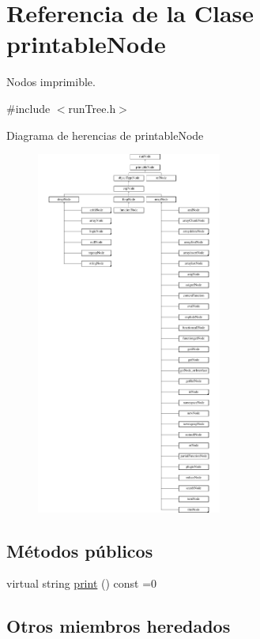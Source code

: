 \hypertarget{classprintableNode}{\section{Referencia de la Clase printable\-Node}
\label{classprintableNode}
}


Nodos imprimible.  




{\ttfamily \#include $<$run\-Tree.\-h$>$}

Diagrama de herencias de printable\-Node\begin{figure}[H]
\begin{center}
\leavevmode
\includegraphics[height=12.000000cm]{classprintableNode}
\end{center}
\end{figure}
\subsection*{Métodos públicos}
\begin{DoxyCompactItemize}
\item 
virtual string \hyperlink{classprintableNode_ae5835e7b9d1a8af621723798137e01f9}{print} () const =0
\end{DoxyCompactItemize}
\subsection*{Otros miembros heredados}


